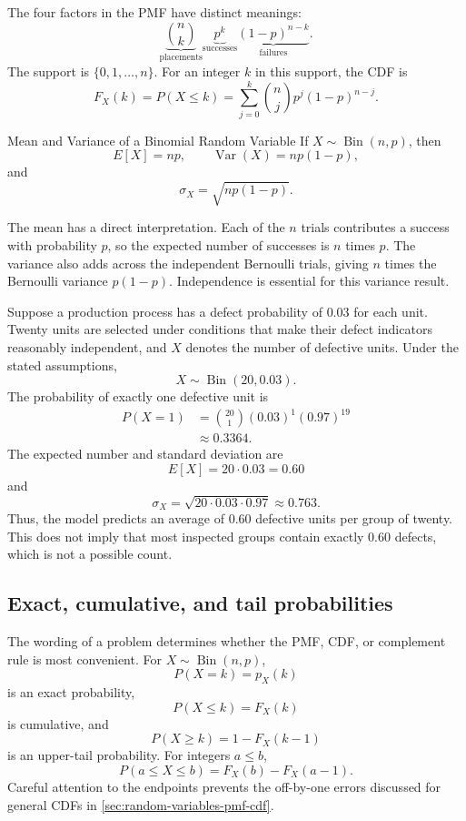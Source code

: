 The four factors in the PMF have distinct meanings:
\[
\underbrace{\binom{n}{k}}_{\text{placements}}
\underbrace{p^k}_{\text{successes}}
\underbrace{(1-p)^{n-k}}_{\text{failures}}.
\]
The support is $\{0,1,\ldots,n\}$. For an integer $k$ in this support, the CDF is
\[
F_X(k)
=P(X\leq k)
=\sum_{j=0}^{k}\binom{n}{j}p^j(1-p)^{n-j}.
\]

\begin{theorem}{Mean and Variance of a Binomial Random Variable}
    If $X\sim\operatorname{Bin}(n,p)$, then
    \[
    E[X]=np,
    \qquad
    \operatorname{Var}(X)=np(1-p),
    \]
    and
    \[
    \sigma_X=\sqrt{np(1-p)}.
    \]
\end{theorem}

The mean has a direct interpretation. Each of the $n$ trials contributes a success with probability $p$, so the expected number of successes is $n$ times $p$. The variance also adds across the independent Bernoulli trials, giving $n$ times the Bernoulli variance $p(1-p)$. Independence is essential for this variance result.

\begin{example}\par
Suppose a production process has a defect probability of $0.03$ for each unit. Twenty units are selected under conditions that make their defect indicators reasonably independent, and $X$ denotes the number of defective units. Under the stated assumptions,
\[
X\sim\operatorname{Bin}(20,0.03).
\]
The probability of exactly one defective unit is
\[
\begin{aligned}
P(X=1)
&=\binom{20}{1}(0.03)^1(0.97)^{19}\\
&\approx0.3364.
\end{aligned}
\]
The expected number and standard deviation are
\[
E[X]=20\cdot0.03=0.60
\]
and
\[
\sigma_X
=\sqrt{20\cdot0.03\cdot0.97}
\approx0.763.
\]
Thus, the model predicts an average of $0.60$ defective units per group of twenty. This does not imply that most inspected groups contain exactly $0.60$ defects, which is not a possible count.
\end{example}

\subsection{Exact, cumulative, and tail probabilities}

The wording of a problem determines whether the PMF, CDF, or complement rule is most convenient. For $X\sim\operatorname{Bin}(n,p)$,
\[
P(X=k)=p_X(k)
\]
is an exact probability,
\[
P(X\leq k)=F_X(k)
\]
is cumulative, and
\[
P(X\geq k)=1-F_X(k-1)
\]
is an upper-tail probability. For integers $a\leq b$,
\[
P(a\leq X\leq b)=F_X(b)-F_X(a-1).
\]
Careful attention to the endpoints prevents the off-by-one errors discussed for general CDFs in \autoref{sec:random-variables-pmf-cdf}.

